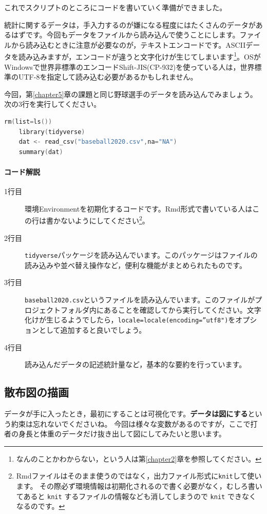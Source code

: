 \documentclass{ltjbook}
\begin{document}
これでスクリプトのところにコードを書いていく準備ができました。

統計に関するデータは，手入力するのが嫌になる程度にはたくさんのデータがあるはずです。今回もデータをファイルから読み込んで使うことにします。ファイルから読み込むときに注意が必要なのが，テキストエンコードです。ASCIIデータを読み込みますが，エンコードが違うと文字化けが生じてしまいます\footnote{なんのことかわからない，という人は第\ref{chapter2}章を参照してください。}。OSがWindowsで世界非標準のエンコードShift-JIS(CP-932)を使っている人は，世界標準のUTF-8を指定して読み込む必要があるかもしれません。

今回，第\ref{chapter5}章の課題と同じ野球選手のデータを読み込んでみましょう。次の3行を実行してください。

\begin{lstlisting}[language=c++,label={code::11_01},caption={環境の初期化とパッケージ，ファイルの読み込み}]
    rm(list=ls())
    library(tidyverse)
    dat <- read_csv("baseball2020.csv",na="NA")
    summary(dat)
\end{lstlisting}

\paragraph{コード解説}
\begin{description}
        \item[1行目] 環境Environmentを初期化するコードです。Rmd形式で書いている人はこの行は書かないようにしてください\footnote{Rmdファイルはそのまま使うのではなく，出力ファイル形式に\verb|knit|して使います。 その際必ず環境情報は初期化されるので書く必要がなく，むしろ書いてあると \verb|knit| するファイルの情報なども消してしまうので \verb|knit| できなくなるのです。}。
        \item[2行目] \texttt{tidyverse}パッケージを読み込んでいます。このパッケージはファイルの読み込みや並べ替え操作など，便利な機能がまとめられたものです。
        \item[3行目] \texttt{baseball2020.csv}というファイルを読み込んでいます。このファイルがプロジェクトフォルダ内にあることを確認してから実行してください。文字化けが生じるようでしたら，\verb|locale=locale(encoding=”utf8")|をオプションとして追加すると良いでしょう。
        \item[4行目] 読み込んだデータの記述統計量など，基本的な要約を行っています。
\end{description}

\subsection{散布図の描画}
データが手に入ったとき，最初にすることは可視化です。\textbf{データは図にする}という約束は忘れないでくださいね。
今回は様々な変数があるのですが，ここで打者の身長と体重のデータだけ抜き出して図にしてみたいと思います。
\end{document}
